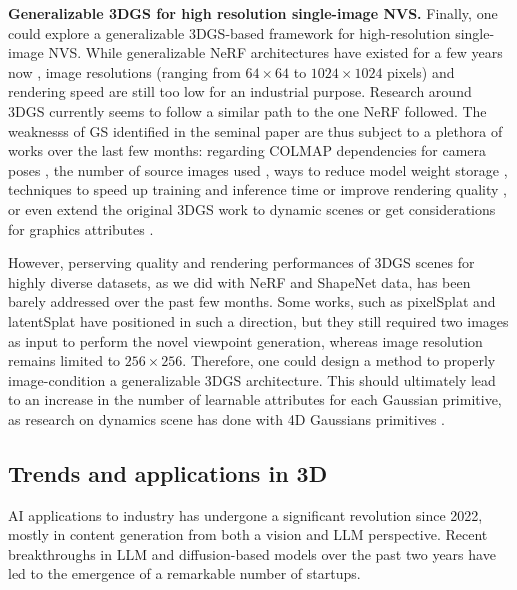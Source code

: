 %
\noindent \textbf{Generalizable 3DGS for high resolution single-image NVS.} Finally, one could explore a generalizable 3D\ac{GS}-based framework for high-resolution single-image \ac{NVS}. While generalizable \ac{NeRF} architectures have existed for a few years now \citep{yu2021pixelnerf,li2022symmnerf,lin2023vision}, image resolutions (ranging from $64\times 64$ to $1024\times 1024$ pixels) and rendering speed are still too low for an industrial purpose. Research around 3D\ac{GS} currently seems to follow a similar path to the one \ac{NeRF} followed. The weaknesss of \ac{GS} identified in the seminal paper \citep{kerbl20233d} are thus subject to a plethora of works over the last few months: regarding COLMAP dependencies for camera poses \citep{fu2023colmapfree}, the number of source images used \citep{xiong2023sparsegs,yang2024gaussianobject}, ways to reduce model weight storage \citep{niedermayr2023compressed}, techniques to speed up training and inference time \citep{fan2024instantsplat} or improve rendering quality \citep{yu2023mip}, or even extend the original 3D\ac{GS} work to dynamic scenes \citep{luiten2023dynamic} or get considerations for graphics attributes \citep{wu2024deferredgs}.  

However, perserving quality and rendering performances of 3D\ac{GS} scenes for highly diverse datasets, as we did with \ac{NeRF} \citep{landreau2024epinerf} and ShapeNet \citep{chang2015shapenet} data, has been barely addressed over the past few months. Some works, such as pixelSplat \citep{charatan23pixelsplat} and latentSplat \citep{wewer24latentsplat} have positioned in such a direction, but they still required two images as input to perform the novel viewpoint generation, whereas image resolution remains limited to $256\times 256$. Therefore, one could design a method to properly image-condition a generalizable 3D\ac{GS} architecture. This should ultimately lead to an increase in the number of learnable attributes for each Gaussian primitive, as research on dynamics scene has done with 4D Gaussians primitives \citep{luiten2023dynamic,gao2024gaussianflow}.  

\subsection{Trends and applications in 3D}
\ac{AI} applications to industry has undergone a significant revolution since 2022, mostly in content generation from both a vision and \ac{LLM} perspective. Recent breakthroughs in \ac{LLM} and diffusion-based models over the past two years have led to the emergence of a remarkable number of startups. 


